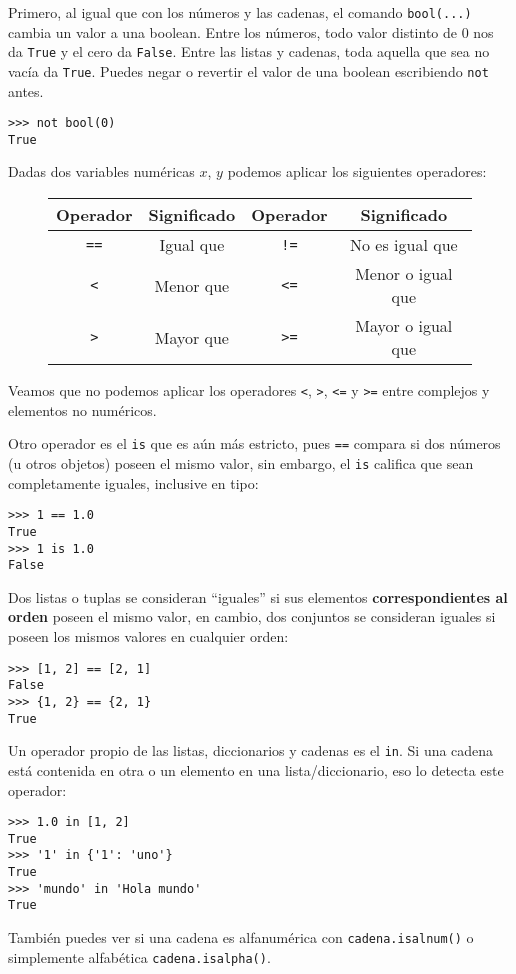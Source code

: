 \documentclass[11pt,twoside]{report}
\begin{document}
Primero, al igual que con los números y las cadenas, el comando \lstinline|bool(...)| cambia un valor a una boolean. Entre los números, todo valor distinto de 0 nos da \lstinline|True| y el cero da \lstinline|False|. Entre las listas y cadenas, toda aquella que sea no vacía da \lstinline|True|. Puedes negar o revertir el valor de una boolean escribiendo \lstinline|not| antes.
\begin{lstlisting}
>>> not bool(0)
True
\end{lstlisting}
Dadas dos variables numéricas $x$, $y$ podemos aplicar los siguientes operadores:
\begin{figure}
\centering
\begin{tabular}{cc|cc}\hline
Operador & Significado & Operador & Significado\\ \hline\hline
\lstinline|==| & Igual que & \lstinline|!=| & No es igual que\\
\lstinline|<| & Menor que & \lstinline|<=| & Menor o igual que\\
\lstinline|>| & Mayor que & \lstinline|>=| & Mayor o igual que\\ \hline
\end{tabular}
\end{figure}
Veamos que no podemos aplicar los operadores \lstinline|<|, \lstinline|>|, \lstinline|<=| y \lstinline|>=| entre complejos y elementos no numéricos.

Otro operador es el \lstinline|is| que es aún más estricto, pues \lstinline|==| compara si dos números (u otros objetos) poseen el mismo valor, sin embargo, el \lstinline|is| califica que sean completamente iguales, inclusive en tipo:
\begin{lstlisting}
>>> 1 == 1.0
True
>>> 1 is 1.0
False
\end{lstlisting}
Dos listas o tuplas se consideran ``iguales'' si sus elementos \textbf{correspondientes al orden} poseen el mismo valor, en cambio, dos conjuntos se consideran iguales si poseen los mismos valores en cualquier orden:
\begin{lstlisting}
>>> [1, 2] == [2, 1]
False
>>> {1, 2} == {2, 1}
True
\end{lstlisting}
Un operador propio de las listas, diccionarios y cadenas es el \lstinline|in|. Si una cadena está contenida en otra o un elemento en una lista/diccionario, eso lo detecta este operador:
\begin{lstlisting}
>>> 1.0 in [1, 2]
True
>>> '1' in {'1': 'uno'}
True
>>> 'mundo' in 'Hola mundo'
True
\end{lstlisting}
También puedes ver si una cadena es alfanumérica con \lstinline|cadena.isalnum()| o simplemente alfabética \lstinline|cadena.isalpha()|.
\end{document}
